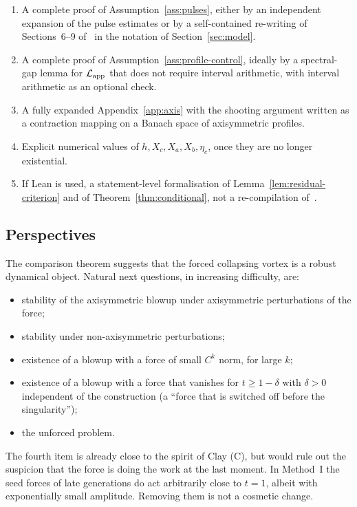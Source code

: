 \begin{enumerate}[leftmargin=1.2em]
\item A complete proof of Assumption~\ref{ass:pulses}, either by an independent expansion of the pulse estimates or by a self-contained re-writing of Sections~6--9 of~\cite{openai2026ns} in the notation of Section~\ref{sec:model}.
\item A complete proof of Assumption~\ref{ass:profile-control}, ideally by a spectral-gap lemma for $\mathcal L_{\mathrm{app}}$ that does not require interval arithmetic, with interval arithmetic as an optional check.
\item A fully expanded Appendix~\ref{app:axis} with the shooting argument written as a contraction mapping on a Banach space of axisymmetric profiles.
\item Explicit numerical values of $h,X_c,X_a,X_b,\eta_c$, once they are no longer existential.
\item If {L}ean is used, a statement-level formalisation of Lemma~\ref{lem:residual-criterion} and of Theorem~\ref{thm:conditional}, not a re-compilation of~\cite{openai2026ns}.
\end{enumerate}

\subsection{Perspectives}

The comparison theorem suggests that the forced collapsing vortex is a robust dynamical object. Natural next questions, in increasing difficulty, are:
\begin{itemize}[leftmargin=1.2em]
\item stability of the axisymmetric blowup under axisymmetric perturbations of the force;
\item stability under non-axisymmetric perturbations;
\item existence of a blowup with a force of small $C^k$ norm, for large $k$;
\item existence of a blowup with a force that vanishes for $t\ge 1-\delta$ with $\delta>0$ independent of the construction (a ``force that is switched off before the singularity'');
\item the unforced problem.
\end{itemize}
The fourth item is already close to the spirit of {C}lay (C), but would rule out the suspicion that the force is doing the work at the last moment. In Method~I the seed forces of late generations do act arbitrarily close to $t=1$, albeit with exponentially small amplitude. Removing them is not a cosmetic change.


